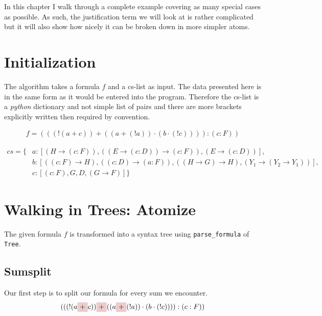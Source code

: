 In this chapter I walk through a complete example covering as many special cases as possible. As such, the justification term we will look at is rather complicated but it will also show how nicely it can be broken down in more simpler atoms.

\section{Initialization}
The algorithm takes a formula $f$ and a cs-list as input. The data presented here is in the same form as it would be entered into the program. Therefore the cs-list is a \emph{python} dictionary and not simple list of pairs and there are more brackets explicitly written then required by convention.

\begin{align}\label{eq:f}
f = (((!(a+c))+((a+(!a))\cdot (b\cdot (!c)))):(c:F))
\end{align}

\begin{equation}\label{cs}
\begin{split}
	cs = \{& a: [(H \rightarrow (c:F)), ((E \rightarrow (c:D)) \rightarrow (c:F)), (E \rightarrow (c:D))],\\
	& b: [((c:F) \rightarrow H), ((c:D) \rightarrow (a:F)), ((H \rightarrow G) \rightarrow H), (Y_1 \rightarrow (Y_2 \rightarrow Y_1))],\\
	& c: [(c:F), G, D, (G \rightarrow F)]\}
\end{split}
\end{equation}




\section{Walking in Trees: Atomize}

The given formula $f$ is transformed into a syntax tree using \texttt{parse\_formula} of \texttt{Tree}. 

\subsection{Sumsplit}
Our first step is to split our formula for every sum we encounter.
\begin{equation*}
	(((!(a
    \tikz[baseline]{\node[fill=red!20,anchor=base] (t1){$+$};} c))
    \tikz[baseline]{\node[fill=red!20,anchor=base] (t2){$+$};} ((a
    \tikz[baseline]{\node[fill=red!20,anchor=base] (t3){$+$};} (!a))\cdot (b\cdot (!c)))):(c:F))
\end{equation*}

